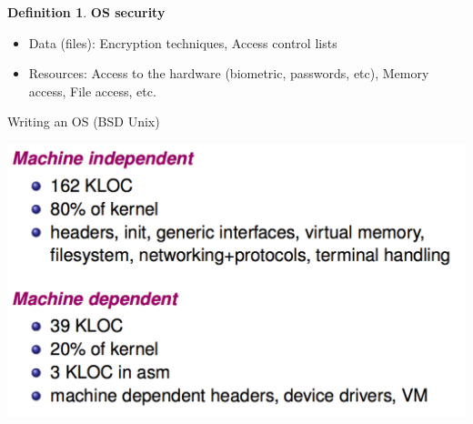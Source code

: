 \documentclass[12pt,a4paper]{article}
\theoremstyle{definition}
\newtheorem{definition}{Definition}[section]
\newenvironment{myitemize}
{ \begin{itemize}
    \setlength{\itemsep}{5pt}
    \setlength{\parskip}{0pt}
    \setlength{\parsep}{0pt}     }
{ \end{itemize}                  }
\begin{document}
\begin{definition}{\textbf{OS security}}
	\begin{myitemize}
		\item Data (files): Encryption techniques, Access control lists
		\item Resources: Access to the hardware (biometric, passwords, etc), Memory access, File access, etc.
	\end{myitemize}
\end{definition}

\begin{tcolorbox}
	\textsf{Writing an OS (BSD Unix)}
	
	\includegraphics[scale=0.3]{m1/writingOS}
	\centering
\end{tcolorbox}
\end{document}
